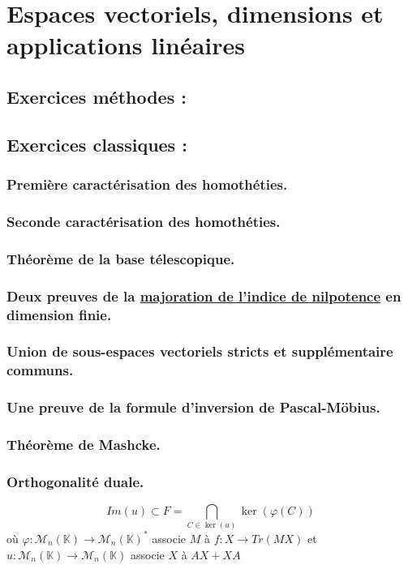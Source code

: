 \section{Espaces vectoriels, dimensions et applications linéaires}
\subsection{Exercices méthodes :}
\subsection{Exercices classiques :}
\subsubsection{Première caractérisation des homothéties.}
\subsubsection{Seconde caractérisation des homothéties.}
\subsubsection{Théorème de la base télescopique.}
\subsubsection{Deux preuves de la \underline{majoration de l'indice de nilpotence} en dimension finie.}
\subsubsection{Union de sous-espaces vectoriels stricts et supplémentaire communs.}
\subsubsection{Une preuve de la formule d'inversion de Pascal-Möbius.}
\subsubsection{Théorème de Mashcke.}
\subsubsection{Orthogonalité duale.}
$$Im(u) \subset F = \bigcap_{C \in \ker(u)}\ker(\varphi(C))$$
où $\varphi:\mathcal{M}_n(\mathbb{K})\rightarrow \mathcal{M}_n(\mathbb{K})^*$ associe $M$ à $f:X \rightarrow Tr(MX)$
et $u : \mathcal{M}_n(\mathbb{K})\rightarrow \mathcal{M}_n(\mathbb{K})$ associe $X$ à $AX + XA$

